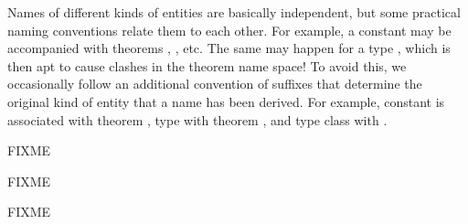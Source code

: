 \begin{isabellebody}
\begin{isamarkuptext}
Names of different kinds of entities are basically independent, but
some practical naming conventions relate them to each other.  For
example, a constant  may be accompanied with theorems
, ,  etc.  The
same may happen for a type , which is then apt to cause
clashes in the theorem name space!  To avoid this, we occasionally
follow an additional convention of suffixes that determine the
original kind of entity that a name has been derived.  For example,
constant  is associated with theorem ,
type  with theorem , and type
class  with .%
\end{isamarkuptext}%
\isamarkuptrue%
%
\endisatagFIXME
{\isafoldFIXME}%
%
\isadelimFIXME
%
\endisadelimFIXME
%
\isamarkuptrue%
%
\isamarkuptrue%
%
\begin{isamarkuptext}%
FIXME%
\end{isamarkuptext}%
\isamarkuptrue%
%
\isamarkuptrue%
%
\begin{isamarkuptext}%
FIXME%
\end{isamarkuptext}%
\isamarkuptrue%
%
\isamarkuptrue%
%
\begin{isamarkuptext}%
FIXME%
\end{isamarkuptext}%
\isamarkuptrue%
%
\isadelimtheory
%
\endisadelimtheory
%
\isatagtheory
{}\isamarkupfalse%
%
\endisatagtheory
{\isafoldtheory}%
%
\isadelimtheory
%
\endisadelimtheory
\isanewline
\end{isabellebody}%
